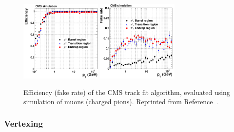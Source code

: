 \begin{figure}[]
    \begin{center} 
        \includegraphics[width=0.36\textwidth]{figures/cms/track_eff.png}
        \includegraphics[width=0.36\textwidth]{figures/cms/track_fake.png}
        \caption{Efficiency (fake rate) of the CMS track fit algorithm, evaluated using simulation of muons (charged pions).
                 Reprinted from Reference~\cite{cmstracker}.}
        \label{fig:cms:trackeff}
    \end{center}
\end{figure}

\subsubsection{Vertexing}

